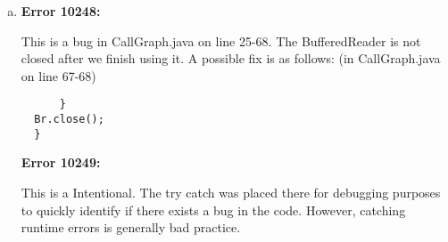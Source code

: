 \documentclass{article}
\begin{document}
\begin{enumerate}[(a)]
  \item
  \textbf{Error 10248:}

  This is a bug in CallGraph.java on line 25-68. The BufferedReader is not closed after we finish using it. A possible fix is as follows: (in CallGraph.java on line 67-68)

  \begin{lstlisting}
      }
  Br.close();
  }
  \end{lstlisting}

  \textbf{Error 10249:}

  This is a Intentional. The try catch was placed there for debugging purposes to quickly identify if there exists a bug in the code. However, catching runtime errors is generally bad practice.
  \end{enumerate}
\end{document}
